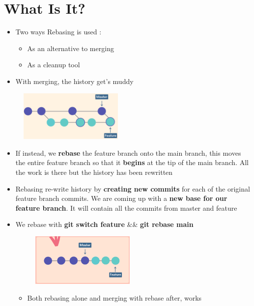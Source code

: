 \documentclass{report}
\begin{document}
\section{What Is It?}

\begin{itemize}
	\item Two ways Rebasing is used :
		\begin{itemize}
			\item As an alternative to merging 
			\item As a cleanup tool
		\end{itemize}
	\item With merging, the history get's muddy
\end{itemize}
\begin{figure}[H] 
	 \centering 
	 \includegraphics[width=2in]{screenshots/2022-07-09T20-15-48Z.png} 
 \end{figure}

\begin{itemize}
	\item If instead, we \textbf{rebase} the feature branch onto the main branch, this moves the entire feature branch so that it \textbf{begins} at the tip of the main branch. All the work is there but the history has been rewritten 
	\item Rebasing re-write history by \textbf{creating new commits} for each of the original feature branch commits. We are coming up with a \textbf{new base for our feature branch}. It will contain all the commits from master and feature  
	\item We rebase with \textbf{git switch feature} \&\& \textbf{git rebase main} 
\begin{figure}[H] 
	 \centering 
	 \includegraphics[width=2in]{screenshots/2022-07-09T20-22-40Z.png} 
\end{figure}

\begin{itemize}
	\item Both rebasing alone and merging with rebase after, works
\end{itemize}

\end{itemize}
\end{document}

